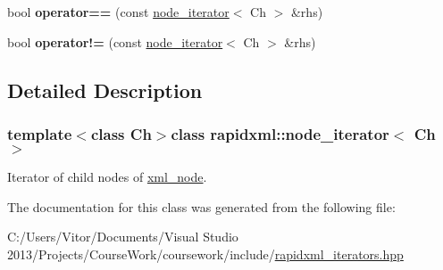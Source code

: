 \begin{DoxyCompactItemize}
\item 
\hypertarget{classrapidxml_1_1node__iterator_a5cb8a3b0d65a1a2517995e986a4debfd}{}bool {\bfseries operator==} (const \hyperlink{classrapidxml_1_1node__iterator}{node\+\_\+iterator}$<$ Ch $>$ \&rhs)\label{classrapidxml_1_1node__iterator_a5cb8a3b0d65a1a2517995e986a4debfd}

\item 
\hypertarget{classrapidxml_1_1node__iterator_a20f1e25347d7e3856694f18597f7c8e2}{}bool {\bfseries operator!=} (const \hyperlink{classrapidxml_1_1node__iterator}{node\+\_\+iterator}$<$ Ch $>$ \&rhs)\label{classrapidxml_1_1node__iterator_a20f1e25347d7e3856694f18597f7c8e2}

\end{DoxyCompactItemize}


\subsection{Detailed Description}
\subsubsection*{template$<$class Ch$>$class rapidxml\+::node\+\_\+iterator$<$ Ch $>$}

Iterator of child nodes of \hyperlink{classrapidxml_1_1xml__node}{xml\+\_\+node}. 

The documentation for this class was generated from the following file\+:\begin{DoxyCompactItemize}
\item 
C\+:/\+Users/\+Vitor/\+Documents/\+Visual Studio 2013/\+Projects/\+Course\+Work/coursework/include/\hyperlink{rapidxml__iterators_8hpp}{rapidxml\+\_\+iterators.\+hpp}\end{DoxyCompactItemize}
